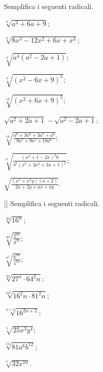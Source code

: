 \begin{esercizio}[\Ast]
 \label{ese:2.30}
Semplifica i seguenti radicali.
 \begin{multicols}{2}
 \begin{enumeratea}
 \item $\sqrt[4]{a^2+6a+9}$;
 \item $\sqrt[9]{8x^3-12x^2+6x+x^3}$;
 \item $\sqrt[4]{a^4(a^2-2a+1)}$;
 \item $\sqrt[4]{(x^2-6x+9)^2}$;
 \item $\sqrt[12]{(x^2+6x+9)^3}$;
 \item $\sqrt{a^2+2a+1}-\sqrt{a^2-2a+1}$;
 \item $\sqrt[18]{\frac{a^9+3a^8+3a^7+a^6}{9a^7+9a^5+18a^6}}$;
 \item $\sqrt[6]{\frac{(x^2+1-2x)^3b}{b^7\left(x^3+3x^2+3x+1\right)^2}}$;
 \item $\sqrt{\frac{\left(x^3+x^2y\right)(a+2)}{2x+2y+ax+ay}}$.
 \end{enumeratea}
 \end{multicols}
\end{esercizio}

\begin{esercizio}
 \label{ese:2.31}[\Ast]
Semplifica i seguenti radicali.
 \begin{multicols}{3}
 \begin{enumeratea}
 \item $\sqrt[2n]{16^n}$;
 \item $\sqrt[4n]{\frac{2^{3n}}{3^{2n}}}$;
 \item $\sqrt[n^2]{\frac{6^{2n}}{5^{3n}}}$;
 \item $\sqrt[3n]{27^n\cdot 64^2n}$;
 \item $\sqrt[2n^2]{16^2n\cdot 81^2n}$;
 \item $\sqrt[n+1]{16^{2n+2}}$;
 \item $\sqrt[5]{25x^3y^4}$;
 \item $\sqrt[12]{81a^6b^{12}}$;
 \item $\sqrt[5]{32x^{10}}$.
 \end{enumeratea}
 \end{multicols}
\end{esercizio}

